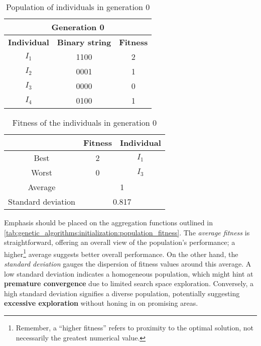   \begin{table}[H]
    \label{tab:genetic_algorithms:initialization:population}
    \centering
    \begin{tabular}{c|c|c}
      \multicolumn{3}{c}{\textbf{Generation 0}} \\
      \hline
      \hline
      \textbf{Individual} & \textbf{Binary string} & \textbf{Fitness} \\
      \hline
      \(I_1\) & 1100 & 2 \\
      \(I_2\) & 0001 & 1 \\
      \(I_3\) & 0000 & 0 \\
      \(I_4\) & 0100 & 1 \\
    \end{tabular}
    \caption{Population of individuals in generation 0}
  \end{table}

  \begin{table}[H]
    \centering
    \begin{tabular}{|c|c|c|}
      \hline
      & \textbf{Fitness} & \textbf{Individual}  \\
      \hline
      Best & 2 & \(I_1\) \\
      Worst & 0 & \(I_3\) \\
      \hline
      \hline
      Average & \multicolumn{2}{c|}{1} \\
      \hline
      Standard deviation & \multicolumn{2}{c|}{0.817} \\
      \hline
    \end{tabular}
    \caption{Fitness of the individuals in generation 0}
    \label{tab:genetic_algorithms:initialization:population_fitness}
  \end{table}
  
  Emphasis should be placed on the aggregation functions outlined in 
  \vref{tab:genetic_algorithms:initialization:population_fitness}.
  The \emph{average fitness} is straightforward, offering an overall view of the 
  population's performance; a higher\footnote{
    Remember, a \enquote{higher fitness} refers to proximity to the optimal 
    solution, not necessarily the greatest numerical value.
  } average suggests better overall performance.
  On the other hand, the \emph{standard deviation} gauges the dispersion of 
  fitness values around this average.
  A low standard deviation indicates a homogeneous population, which might hint 
  at \textbf{premature convergence} due to limited search space exploration.
  Conversely, a high standard deviation signifies a diverse population, 
  potentially suggesting \textbf{excessive exploration} without honing in on 
  promising areas.

